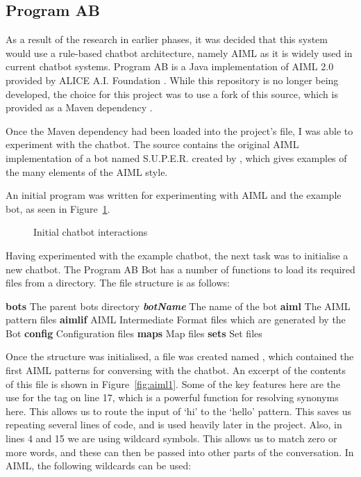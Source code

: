 \subsection{Program AB}
As a result of the research in earlier phases, it was decided that this system would use a rule-based chatbot architecture, namely AIML as it is widely used in current chatbot systems. Program AB is a Java implementation of AIML 2.0 provided by ALICE A.I. Foundation \cite{programab_2013}. While this repository is no longer being developed, the choice for this project was to use a fork of this source, which is provided as a Maven dependency \cite{lumenrobot2016}.

Once the Maven dependency had been loaded into the project's  file, I was able to experiment with the chatbot. The  source contains the original AIML implementation of a bot named S.U.P.E.R. created by \citet{wallace2009anatomy}, which gives examples of the many elements of the AIML style.

An initial program was written for experimenting with AIML and the example bot, as seen in Figure~\ref{fig:super}. 

\begin{figure}[h]
	\centering
	\qquad
	\caption{Initial chatbot interactions}
	\label{fig:super}
\end{figure}

Having experimented with the example chatbot, the next task was to initialise a new chatbot. The Program AB Bot has a number of functions to load its required files from a directory. The file structure is as follows:

\begin{outline}
	\1 \textbf{bots} The parent bots directory
		\2 \textbf{\emph{botName}} The name of the bot
			\3 \textbf{aiml} The AIML pattern files 
			\3 \textbf{aimlif} AIML Intermediate Format files which are generated by the Bot
			\3 \textbf{config} Configuration files
			\3 \textbf{maps} Map files
			\3 \textbf{sets} Set files
\end{outline}
	
Once the structure was initialised, a file was created named , which contained the first AIML patterns for conversing with the chatbot. An excerpt of the contents of this file is shown in Figure~\ref{fig:aiml1}. Some of the key features here are the use for the  tag on line 17, which is a powerful function for resolving synonyms here. This allows us to route the input of `hi' to the `hello' pattern. This saves us repeating several lines of code, and is used heavily later in the project. Also, in lines 4 and 15 we are using wildcard symbols. This allows us to match zero or more words, and these can then be passed into other parts of the conversation. In AIML, the following wildcards can be used:

